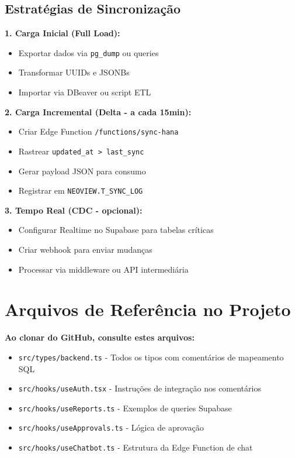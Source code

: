 \documentclass[12pt,a4paper]{article}
\newcommand{\checkbox}{$\square$}
\begin{document}
\subsection{Estratégias de Sincronização}

\textbf{1. Carga Inicial (Full Load):}
\begin{itemize}[label=\checkbox]
    \item Exportar dados via \texttt{pg\_dump} ou queries
    \item Transformar UUIDs e JSONBs
    \item Importar via DBeaver ou script ETL
\end{itemize}

\textbf{2. Carga Incremental (Delta - a cada 15min):}
\begin{itemize}[label=\checkbox]
    \item Criar Edge Function \texttt{/functions/sync-hana}
    \item Rastrear \texttt{updated\_at > last\_sync}
    \item Gerar payload JSON para consumo
    \item Registrar em \texttt{NEOVIEW.T\_SYNC\_LOG}
\end{itemize}

\textbf{3. Tempo Real (CDC - opcional):}
\begin{itemize}[label=\checkbox]
    \item Configurar Realtime no Supabase para tabelas críticas
    \item Criar webhook para enviar mudanças
    \item Processar via middleware ou API intermediária
\end{itemize}

\section{Arquivos de Referência no Projeto}

\begin{tcolorbox}[colback=blue!5!white,colframe=neoblue]
\textbf{Ao clonar do GitHub, consulte estes arquivos:}
\end{tcolorbox}

\begin{itemize}
    \item \texttt{src/types/backend.ts} - Todos os tipos com comentários de mapeamento SQL
    \item \texttt{src/hooks/useAuth.tsx} - Instruções de integração nos comentários
    \item \texttt{src/hooks/useReports.ts} - Exemplos de queries Supabase
    \item \texttt{src/hooks/useApprovals.ts} - Lógica de aprovação
    \item \texttt{src/hooks/useChatbot.ts} - Estrutura da Edge Function de chat
\end{itemize}
\end{document}
